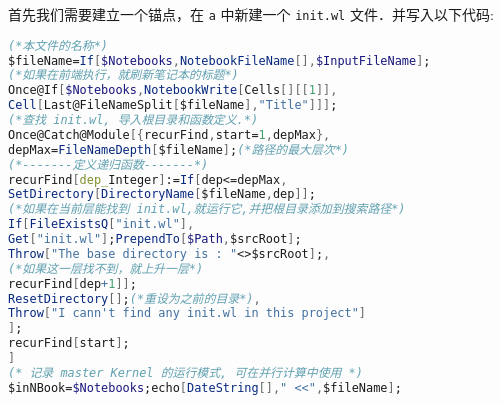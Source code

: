 首先我们需要建立一个锚点，在 \verb`a` 中新建一个 \verb`init.wl` 文件．并写入以下代码:
\begin{lstlisting}[language=mathematica]
(*本文件的名称*)
$fileName=If[$Notebooks,NotebookFileName[],$InputFileName];
(*如果在前端执行，就刷新笔记本的标题*)
Once@If[$Notebooks,NotebookWrite[Cells[][[1]],
Cell[Last@FileNameSplit[$fileName],"Title"]]];
(*查找 init.wl, 导入根目录和函数定义.*)
Once@Catch@Module[{recurFind,start=1,depMax},
depMax=FileNameDepth[$fileName];(*路径的最大层次*)
(*-------定义递归函数-------*)
recurFind[dep_Integer]:=If[dep<=depMax,
SetDirectory[DirectoryName[$fileName,dep]];
(*如果在当前层能找到 init.wl,就运行它,并把根目录添加到搜索路径*)
If[FileExistsQ["init.wl"],
Get["init.wl"];PrependTo[$Path,$srcRoot];
Throw["The base directory is : "<>$srcRoot];,
(*如果这一层找不到，就上升一层*)
recurFind[dep+1]];
ResetDirectory[];(*重设为之前的目录*),
Throw["I cann't find any init.wl in this project"]
];
recurFind[start];
]
(* 记录 master Kernel 的运行模式, 可在并行计算中使用 *)
$inNBook=$Notebooks;echo[DateString[]," <<",$fileName];
\end{lstlisting}
